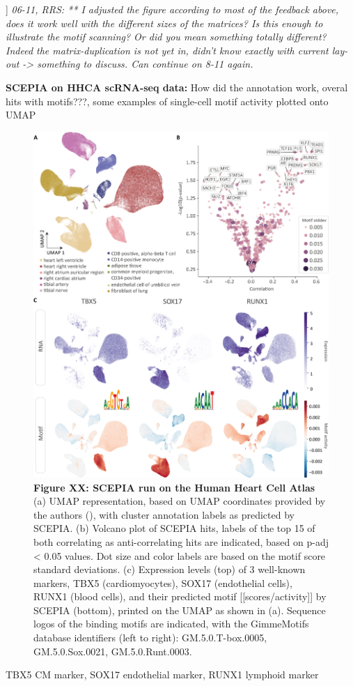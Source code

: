 ]
\textit{06-11, RRS: ** I adjusted the figure according to most of the feedback above, does it work well with the different sizes of the matrices? Is this enough to illustrate the motif scanning? Or did you mean something totally different? Indeed the matrix-duplication is not yet in, didn't know exactly with current lay-out -> something to discuss. 
Can continue on 8-11 again.}

\textbf{SCEPIA on HHCA scRNA-seq data: }
How did the annotation work, overal hits with motifs???, some examples of single-cell motif activity plotted onto UMAP
\begin{figure}
    \centering
    \includegraphics[width=0.75\linewidth]{SCEPIA_allCells_Fig1_v9.png}
    \caption{\textbf{Figure XX: SCEPIA run on the Human Heart Cell Atlas} (a) UMAP representation, based on UMAP coordinates provided by the authors (\cite{Kanemaru2023}), with cluster annotation labels as predicted by SCEPIA. (b) Volcano plot of SCEPIA hits, labels of the top 15 of both correlating as anti-correlating hits are indicated, based on p-adj < 0.05 values. Dot size and color labels are based on the motif score standard deviations.  (c) Expression levels (top) of 3 well-known markers, TBX5 (cardiomyocytes), SOX17 (endothelial cells), RUNX1 (blood cells), and their predicted motif [[scores/activity]] by SCEPIA (bottom), printed on the UMAP as shown in (a). Sequence logos of the binding motifs are indicated, with the GimmeMotifs database identifiers (left to right): GM.5.0.T-box.0005, GM.5.0.Sox.0021, GM.5.0.Runt.0003. }
    \label{fig:scepia_hhca1}
\end{figure}
TBX5 CM marker, SOX17 endothelial marker, RUNX1 lymphoid marker 

